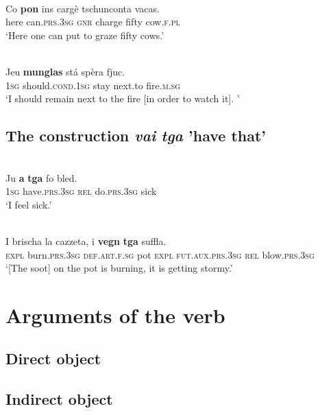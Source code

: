 \ea\label{}
\\
\gll   Co \textbf{pon} ins cargè tschunconta vacas.\\
     here can.\textsc{prs.3sg} \textsc{gnr} charge fifty cow.\textsc{f.pl}\\
\glt `Here one can put to graze fifty cows.'
\z

\ea\label{}
\\
\gll  Jeu \textbf{munglas} stá spèra fjuc. \\
    \textsc{1sg} should.\textsc{cond.1sg} stay next.to fire.\textsc{m.sg} \\
\glt `I should remain next to the fire [in order to watch it]. '
\z


\subsection{The construction \textit{vai} \textit{tga} 'have that'}

\ea\label{}
\\
\gll  Ju \textbf{a} \textbf{tga} fo bled.\\
     \textsc{1sg} have.\textsc{prs.3sg} \textsc{rel} do.\textsc{prs.3sg} sick\\
\glt `I feel sick.'
\z

\ea\label{}
\\
\gll I brischa la cazzeta, i \textbf{vegn} \textbf{tga} suffla. \\
   \textsc{expl} burn.\textsc{prs.3sg} \textsc{def.art.f.sg} pot \textsc{expl} \textsc{fut.aux.prs.3sg} \textsc{rel} blow.\textsc{prs.3sg} \\
\glt `[The soot] on the pot is burning, it is getting stormy.'
\z



\section{Arguments of the verb} 
 
\subsection{Direct object}

\subsection{Indirect object}
 




